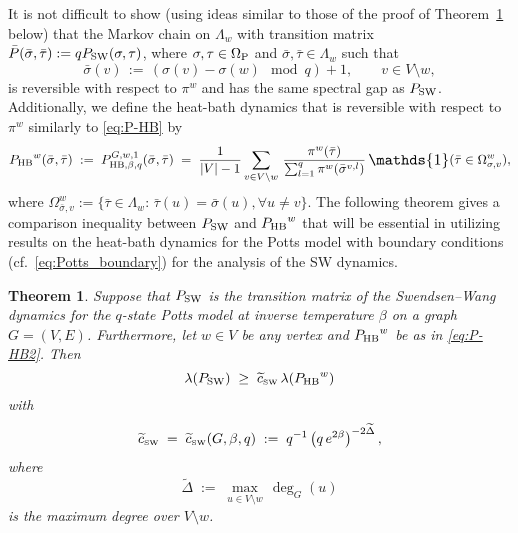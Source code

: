 \documentclass{dis}
\newtheorem{theorem}{Theorem}[chapter]
\theoremstyle{citing}
\begin{document}
It is not difficult to show (using ideas similar to those of the 
proof of Theorem~\ref{th:main-spin2} below) that the 
Markov chain on $\Lambda_w$ with transition matrix 
$\bar{P}(\bar\sigma,\bar\tau):= q {P_{\rm SW}}(\sigma,\tau)$, where 
$\sigma,\tau\in{{\Omega}_{\rm P}}$ and $\bar\sigma,\bar\tau\in\Lambda_w$ such that 
\[
\bar\sigma(v) \,:=\, (\sigma(v)-\sigma(w)\mod q)+1, \qquad v\in V\setminus w,
\] 
is reversible with respect to $\pi^w$ 
and has the same spectral gap as ${P_{\rm SW}}$.
Additionally, we define the heat-bath dynamics that is reversible 
with respect to $\pi^w$ similarly 
to \eqref{eq:P-HB} by 
\begin{equation}\label{eq:P-HB2}
{P_{\rm HB}}^w(\bar\sigma,\bar\tau) 
\;:=\; P_{{\rm HB},\beta,q}^{G,w,1}(\bar\sigma,\bar\tau) \;=\;
\frac{1}{{\left\vert {V} \right\vert}-1}\sum_{v\in V\setminus w}\,
	\frac{\pi^w(\bar\tau)}
	{\sum_{l=1}^q\pi^w(\bar\sigma^{v,l})}\,
	{\scalebox{1.2}{\raisebox{-0.2mm}{$\mathds{1}$}}}(\bar\tau\in{\Omega}^w_{\sigma,v}), 
\end{equation}
where ${\Omega}^w_{\bar\sigma,v}:=\{\bar\tau\in\Lambda_w:\, 
\bar\tau(u)=\bar\sigma(u), \forall u\neq v\}$.
The following theorem gives a comparison inequality between 
${P_{\rm SW}}$ and ${P_{\rm HB}}^w$ that will be essential in utilizing results 
on the heat-bath dynamics for the Potts model with boundary 
conditions (cf.~\eqref{eq:Potts_boundary}) for the analysis 
of the SW dynamics.

\vspace{2mm}
\begin{theorem}\label{th:main-spin2}
Suppose that ${P_{\rm SW}}$ is the transition matrix of the 
Swendsen--Wang dynamics for the $q$-state Potts 
model at inverse temperature $\beta$ on a graph $G=(V,E)$. 
Furthermore, let $w\in V$ be any vertex and ${P_{\rm HB}}^w$ be as in 
\eqref{eq:P-HB2}. 
Then
\[
\lambda({P_{\rm SW}}) \;\ge\; {\widetilde{c}_{\text{\rm\tiny SW}}}\,\lambda({P_{\rm HB}}^w) 
\]
with
\[
{\widetilde{c}_{\text{\rm\tiny SW}}} \;=\; {\widetilde{c}_{\text{\rm\tiny SW}}}(G,\beta,q) 
\;:=\; q^{-1}\left(q\,e^{2\beta}\right)^{-2\widetilde{\Delta}}, 
\]
where
\[
\widetilde{\Delta} \;:=\; \max_{u\in V\setminus w}\,\deg_G(u)
\] 
is the maximum degree over $V\setminus w$.
\end{theorem}
\end{document}
